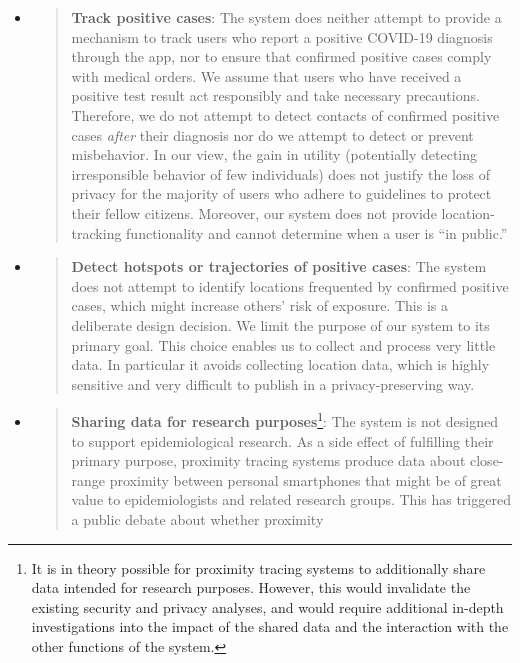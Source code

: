 \documentclass{article}
\begin{document}
\begin{itemize}
\item
  \begin{quote}
  \textbf{Track positive cases}: The system does neither attempt to
  provide a mechanism to track users who report a positive COVID-19
  diagnosis through the app, nor to ensure that confirmed positive cases
  comply with medical orders. We assume that users who have received a
  positive test result act responsibly and take necessary precautions.
  Therefore, we do not attempt to detect contacts of confirmed positive
  cases \emph{after} their diagnosis nor do we attempt to detect or
  prevent misbehavior. In our view, the gain in utility (potentially
  detecting irresponsible behavior of few individuals) does not justify
  the loss of privacy for the majority of users who adhere to guidelines
  to protect their fellow citizens. Moreover, our system does not
  provide location-tracking functionality and cannot determine when a
  user is ``in public.''
  \end{quote}
\item
  \begin{quote}
  \textbf{Detect hotspots or trajectories of positive cases}: The system
  does not attempt to identify locations frequented by confirmed
  positive cases, which might increase others' risk of exposure. This is
  a deliberate design decision. We limit the purpose of our system to
  its primary goal. This choice enables us to collect and process very
  little data. In particular it avoids collecting location data, which
  is highly sensitive and very difficult to publish in a
  privacy-preserving way.
  \end{quote}
\item
  \begin{quote}
  \textbf{Sharing data for research purposes}\footnote{It is in theory
    possible for proximity tracing systems to additionally share data
    intended for research purposes. However, this would invalidate the
    existing security and privacy analyses, and would require additional
    in-depth investigations into the impact of the shared data and the
    interaction with the other functions of the system.}: The system is
  not designed to support epidemiological research. As a side effect of
  fulfilling their primary purpose, proximity tracing systems produce
  data about close-range proximity between personal smartphones that
  might be of great value to epidemiologists and related research
  groups. This has triggered a public debate about whether proximity

\end{quote}
\end{itemize}
\end{document}
